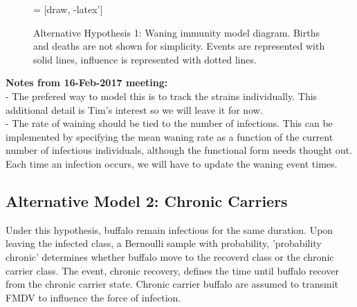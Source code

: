 \documentclass{article}
\begin{document}
\begin{figure}[H]
  \centering
   = [draw, -latex']
  \caption{Alternative Hypothesis 1: Waning immunity model diagram. Births and deaths are not shown for simplicity. Events are represented with solid lines, influence is represented with dotted lines. }
  \label{fig:diagram2}
\end{figure}

\noindent \textbf{Notes from 16-Feb-2017 meeting:} \\
  - The prefered way to model this is to track the strains individually.  This additional detail is Tim's interest so we will leave it for now.   \\
  - The rate of waining should be tied to the number of infections. 
  This can be implemented by specifying the mean waning rate as a function of the current number of infectious individuals, although the functional form needs thought out.  
  Each time an infection occurs, we will have to update the waning event times. 


\subsection{Alternative Model 2: Chronic Carriers}
Under this hypothesis, buffalo remain infectious for the same duration.  
Upon leaving the infected class, a Bernoulli sample with probability, 'probability chronic' determines whether buffalo move to the recoverd class or the chronic carrier class.
The event, chronic recovery, defines the time until buffalo recover from the chronic carrier state.  
Chronic carrier buffalo are assumed to transmit FMDV to influence the force of infection.
\end{document}
